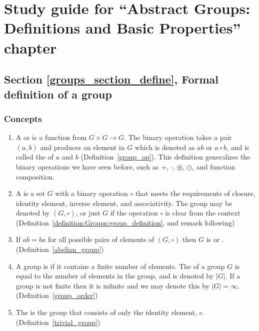 \section{Study guide  for ``Abstract Groups: Definitions and Basic Properties''  chapter}\label{sec:Groups:study} 


\subsection*{Section \ref{groups_section_define}, Formal definition of a group}
\subsubsection*{Concepts}
\begin{enumerate}
\item %
A  or  is a function from $G \times G \rightarrow G$. The binary operation takes a pair $(a,b)$ and produces an element in $G$ which is denoted as $ab$ or $a \circ b$, and is  called the  of $a$ and $b$ (Definition~\ref{group_op}). This definition generalizes the binary operations we have seen before, such as +, $\cdot$, $\oplus$, $\odot$, and function composition.
\item
A  is a set $G$ with a binary operation $\circ$ that meets the requirements of closure, identity element, inverse element, and associativity. The group may be denoted by $(G,\circ)$, or just $G$ if the operation $\circ$ is clear from the context  (Definition~\ref{definition:Groups:group_definition}, and remark following)
\item
If $ab=ba$ for all possible pairs of elements of $(G, \circ)$ then $G$ is  or . (Definition~\ref{abelian_group})
\item
 A group is   if it contains a finite number of elements.  The  of a group $G$ is equal to the number of elements in the group, and is denoted by $|G|$. If a group is not finite then it is infinite and we may denote this by $|G| = \infty$. (Definition~\ref{group_order})
\item
The  is the group that consists of only the identity element, $e$. (Definition~\ref{trivial_group})
\end{enumerate}

